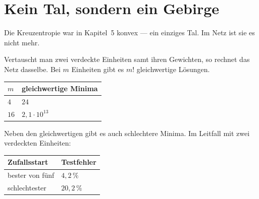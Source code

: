 \section{Kein Tal, sondern ein Gebirge}

\begin{warnung}
Die Kreuzentropie war in Kapitel~5 konvex --- ein einziges Tal. Im Netz ist sie es nicht mehr.

Vertauscht man zwei verdeckte Einheiten samt ihren Gewichten, so rechnet das Netz dasselbe. Bei $m$ Einheiten gibt es $m!$ gleichwertige Lösungen.

\begin{center}
{\small
\renewcommand{\arraystretch}{1.46}
\begin{tabular}{@{}P{2.4cm}P{4.0cm}@{}}
\toprule
$m$ & \textbf{gleichwertige Minima}\\
\midrule
$4$ & $24$\\
$16$ & $2{,}1\cdot10^{13}$\\
\bottomrule
\end{tabular}}
\end{center}

\begin{center}
\begin{minipage}{0.88\textwidth}
\end{minipage}
\end{center}

Neben den gleichwertigen gibt es auch schlechtere Minima. Im Leitfall mit zwei verdeckten Einheiten:

\begin{center}
{\small
\renewcommand{\arraystretch}{1.46}
\begin{tabular}{@{}P{2.8cm}P{3.0cm}@{}}
\toprule
\textbf{Zufallsstart} & \textbf{Testfehler}\\
\midrule
bester von fünf & $4{,}2\,\%$\\
schlechtester & $20{,}2\,\%$\\
\bottomrule
\end{tabular}}
\end{center}

\begin{center}
\begin{minipage}{0.88\textwidth}
\end{minipage}
\end{center}
\end{warnung}

